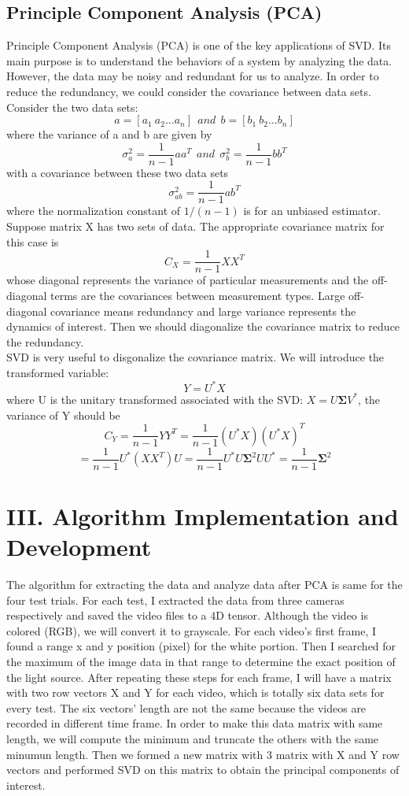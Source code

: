 \documentclass[12pt,letterpaper]{article}
\begin{document}
\subsection*{Principle Component Analysis (PCA)}
Principle Component Analysis (PCA) is one of the key applications of SVD. Its main purpose is to understand the behaviors of a system by analyzing the data. However, the data may be noisy and redundant for us to analyze. In order to reduce the redundancy, we could consider the covariance between data sets. Consider the two data sets:
$$a = [a_1\:a_2...a_n]\:\:and\:\:b = [b_1\:b_2...b_n]$$
where the variance of a and b are given by
$$\sigma^2_a = \dfrac{1}{n-1}aa^T\: \:and \:\:\sigma^2_b = \dfrac{1}{n-1}bb^T$$
with a covariance between these two data sets 
$$\sigma^2_{ab} = \dfrac{1}{n-1}ab^T$$
where the normalization constant of $1/(n-1)$ is for an unbiased estimator. Suppose matrix X has two sets of data. The appropriate covariance matrix for this case is 
$$C_X = \dfrac{1}{n-1}XX^T$$
whose diagonal represents the variance of particular measurements and the off-diagonal terms are the covariances between measurement types. Large off-diagonal covariance means redundancy and large variance represents the dynamics of interest. Then we should diagonalize the covariance matrix to reduce the redundancy. 
\\SVD is very useful to disgonalize the covariance matrix. We will introduce the transformed variable:
$$Y = U^*X$$
where U is the unitary transformed associated with the SVD: $X = U\mathbf{\Sigma}V^*$, the variance of Y should be 
$$ C_Y = \dfrac{1}{n-1}YY^T = \dfrac{1}{n-1}(U^*X)(U^*X)^T$$
$$ = \dfrac{1}{n-1}U^*(XX^T)U = \dfrac{1}{n-1}U^*U\mathbf{\Sigma}^2UU^* = \dfrac{1}{n-1}\mathbf{\Sigma}^2$$
\section*{III. Algorithm Implementation and Development}
The algorithm for extracting the data and analyze data after PCA is same for the four test trials. For each test, I extracted the data from three cameras respectively and saved the video files to a 4D tensor. Although the video is colored (RGB), we will convert it to grayscale. For each video's first frame, I found a range x and y position (pixel) for the white portion. Then I searched for the maximum of the image data in that range to determine the exact position of the light source. After repeating these steps for each frame, I will have a matrix with two row vectors X and Y for each video, which is totally six data sets for every test. The six vectors' length are not the same because the videos are recorded in different time frame. In order to make this data matrix with same length, we will compute the minimum and truncate the others with the same minumun length. Then we formed a new matrix with 3 matrix with X and Y row vectors and performed SVD on this matrix to obtain the principal components of interest. 
\end{document}
